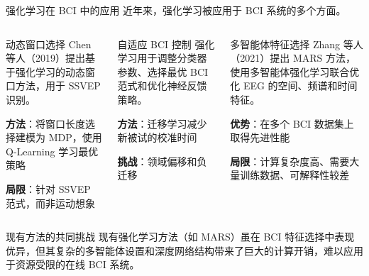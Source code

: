 {\begin{frame}{强化学习在 BCI 中的应用}
    近年来，强化学习被应用于 BCI 系统的多个方面\cite{zhang2021mars}。

    \vspace{0.25cm}
    \begin{columns}[T]
        \begin{block}{动态窗口选择}
            \scriptsize
            Chen 等人（2019）提出基于强化学习的动态窗口方法\cite{chen2019dynamic}，用于 SSVEP 识别。
            
            \vspace{0.15cm}
            \textbf{方法}：将窗口长度选择建模为 MDP，使用 Q-Learning 学习最优策略
            
            \vspace{0.1cm}
            \textbf{局限}：针对 SSVEP 范式，而非运动想象
        \end{block}

        \begin{block}{自适应 BCI 控制}
            \scriptsize
            强化学习用于调整分类器参数、选择最优 BCI 范式和优化神经反馈策略\cite{jayaram2016transfer}。
            
            \vspace{0.15cm}
            \textbf{方法}：迁移学习减少新被试的校准时间
            
            \vspace{0.1cm}
            \textbf{挑战}：领域偏移和负迁移
        \end{block}

        \begin{block}{多智能体特征选择}
            \scriptsize
            Zhang 等人（2021）提出 MARS 方法\cite{zhang2021mars}，使用多智能体强化学习联合优化 EEG 的空间、频谱和时间特征。
            
            \vspace{0.15cm}
            \textbf{优势}：在多个 BCI 数据集上取得先进性能
            
            \vspace{0.1cm}
            \textbf{局限}：计算复杂度高、需要大量训练数据、可解释性较差
        \end{block}
    \end{columns}

    \vspace{0.25cm}
    \begin{alertblock}{现有方法的共同挑战}
        \scriptsize
        现有强化学习方法（如 MARS）虽在 BCI 特征选择中表现优异，但其复杂的多智能体设置和深度网络结构带来了巨大的计算开销，难以应用于资源受限的在线 BCI 系统。
    \end{alertblock}
\end{frame}

}
